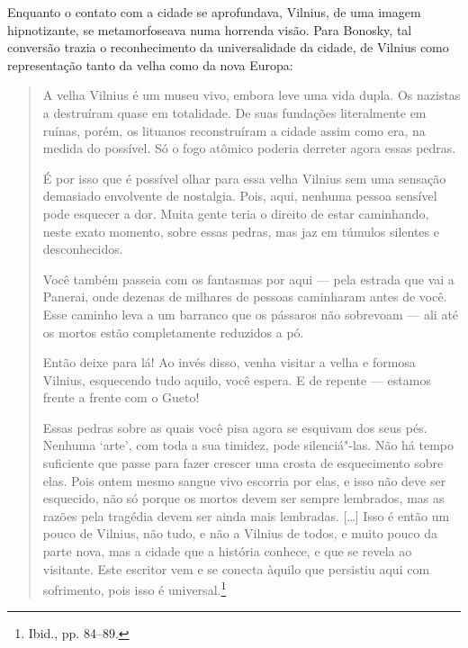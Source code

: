Enquanto o contato com a cidade se aprofundava, Vilnius, de uma imagem
hipnotizante, se metamorfoseava numa horrenda visão. Para Bonosky, tal
conversão trazia o reconhecimento da universalidade da cidade, de
Vilnius como representação tanto da velha como da nova Europa:

\begin{quote}
A velha Vilnius é um museu vivo, embora leve uma vida dupla. Os nazistas
a destruíram quase em totalidade. De suas fundações literalmente em
ruínas, porém, os lituanos reconstruíram a cidade assim como era, na
medida do possível. Só o fogo atômico poderia derreter agora essas
pedras.

É por isso que é possível olhar para essa velha Vilnius sem uma sensação
demasiado envolvente de nostalgia. Pois, aqui, nenhuma pessoa sensível
pode esquecer a dor. Muita gente teria o direito de estar caminhando,
neste exato momento, sobre essas pedras, mas jaz em túmulos silentes e
desconhecidos.

Você também passeia com os fantasmas por aqui --- pela estrada que vai a
Panerai, onde dezenas de milhares de pessoas caminharam antes de você.
Esse caminho leva a um barranco que os pássaros não sobrevoam --- ali até
os mortos estão completamente reduzidos a pó.

Então deixe para lá! Ao invés disso, venha visitar a velha e formosa
Vilnius, esquecendo tudo aquilo, você espera. E de repente --- estamos
frente a frente com o Gueto!

Essas pedras sobre as quais você pisa agora se esquivam dos seus pés.
Nenhuma `arte', com toda a sua timidez, pode silenciá"-las. Não há tempo
suficiente que passe para fazer crescer uma crosta de esquecimento sobre
elas. Pois ontem mesmo sangue vivo escorria por elas, e isso não deve
ser esquecido, não só porque os mortos devem ser sempre lembrados, mas
as razões pela tragédia devem ser ainda mais lembradas. [\ldots{}] Isso é
então um pouco de Vilnius, não tudo, e não a Vilnius de todos, e muito
pouco da parte nova, mas a cidade que a história conhece, e que se
revela ao visitante. Este escritor vem e se conecta àquilo que persistiu
aqui com sofrimento, pois isso é universal.\footnote{Ibid., pp. 84--89.}
\end{quote}

